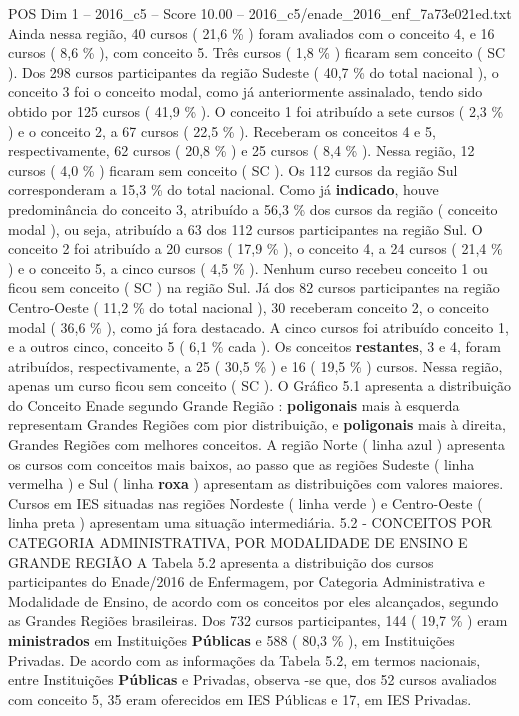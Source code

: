 \begin{textsample}{POS Dim 1 – 2016\_c5 – Score 10.00 – 2016\_c5/enade\_2016\_enf\_7a73e021ed.txt}
Ainda nessa região, 40 cursos ( 21,6 \% ) foram avaliados com o conceito 4, e 16 cursos ( 8,6 \% ), com conceito 5.
Três cursos ( 1,8 \% ) ficaram sem conceito ( SC ).
Dos 298 cursos participantes da região Sudeste ( 40,7 \% do total nacional ), o conceito 3 foi o conceito modal, como já anteriormente assinalado, tendo sido obtido por 125 cursos ( 41,9 \% ).
O conceito 1 foi atribuído a sete cursos ( 2,3 \% ) e o conceito 2, a 67 cursos ( 22,5 \% ).
Receberam os conceitos 4 e 5, respectivamente, 62 cursos ( 20,8 \% ) e 25 cursos ( 8,4 \% ).
Nessa região, 12 cursos ( 4,0 \% ) ficaram sem conceito ( SC ).
Os 112 cursos da região Sul corresponderam a 15,3 \% do total nacional.
Como já \textbf{indicado}, houve predominância do conceito 3, atribuído a 56,3 \% dos cursos da região ( conceito modal ), ou seja, atribuído a 63 dos 112 cursos participantes na região Sul.
O conceito 2 foi atribuído a 20 cursos ( 17,9 \% ), o conceito 4, a 24 cursos ( 21,4 \% ) e o conceito 5, a cinco cursos ( 4,5 \% ).
Nenhum curso recebeu conceito 1 ou ficou sem conceito ( SC ) na região Sul.
Já dos 82 cursos participantes na região Centro-Oeste ( 11,2 \% do total nacional ), 30 receberam conceito 2, o conceito modal ( 36,6 \% ), como já fora destacado.
A cinco cursos foi atribuído conceito 1, e a outros cinco, conceito 5 ( 6,1 \% cada ).
Os conceitos \textbf{restantes}, 3 e 4, foram atribuídos, respectivamente, a 25 ( 30,5 \% ) e 16 ( 19,5 \% ) cursos.
Nessa região, apenas um curso ficou sem conceito ( SC ).
O Gráfico 5.1 apresenta a distribuição do Conceito Enade segundo Grande Região : \textbf{poligonais} mais à esquerda representam Grandes Regiões com pior distribuição, e \textbf{poligonais} mais à direita, Grandes Regiões com melhores conceitos.
A região Norte ( linha azul ) apresenta os cursos com conceitos mais baixos, ao passo que as regiões Sudeste ( linha vermelha ) e Sul ( linha \textbf{roxa} ) apresentam as distribuições com valores maiores.
Cursos em IES situadas nas regiões Nordeste ( linha verde ) e Centro-Oeste ( linha preta ) apresentam uma situação intermediária. 5.2 - CONCEITOS POR CATEGORIA ADMINISTRATIVA, POR MODALIDADE DE ENSINO E GRANDE REGIÃO A Tabela 5.2 apresenta a distribuição dos cursos participantes do Enade/2016 de Enfermagem, por Categoria Administrativa e Modalidade de Ensino, de acordo com os conceitos por eles alcançados, segundo as Grandes Regiões brasileiras.
Dos 732 cursos participantes, 144 ( 19,7 \% ) eram \textbf{ministrados} em Instituições \textbf{Públicas} e 588 ( 80,3 \% ), em Instituições Privadas.
De acordo com as informações da Tabela 5.2, em termos nacionais, entre Instituições \textbf{Públicas} e Privadas, observa -se que, dos 52 cursos avaliados com conceito 5, 35 eram oferecidos em IES Públicas e 17, em IES Privadas.

\end{textsample}
